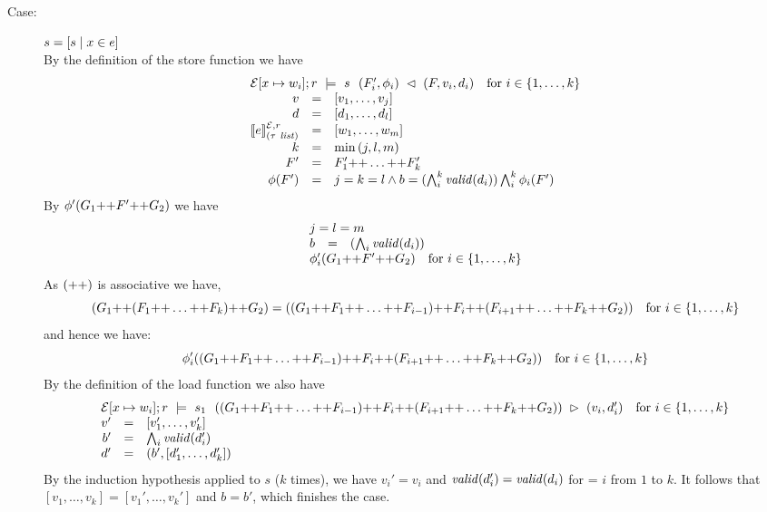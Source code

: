 {\begin{description}
\item[Case:] $s = [ s \mid x \in e ]$\\[1ex]
By the definition of the store function we have
\[
\begin{array}{rcll}
\multicolumn{3}{l}{\store{\Env[x \mapsto w_i]}{F}{r}{v_i,d_i}{s}{F_i',\phi_i} \quad \text{for}~i \in \{1,\dots,k\}}\\
v &=& [v_1,\dots,v_j]\\
d &=& [d_1,\dots,d_l]\\
\eval{e}{\Env,r}{(\tau\ \mathit{list})} &=& [w_1,\dots,w_m ]\\
k &=& \min{(j,l,m)}\\
F' &=& F_1' \FAppend \dots \FAppend F_k'\\
\phi(F') &=& j = k = l \wedge b = (\bigwedge_i^k \valid{d_i}) \bigwedge_i^k \phi_i(F')\\
\end{array}
\]
By $\phi'(G_1 \text{++} F' \text{++} G_2)$ we have
\[
\begin{array}{rcll}
\multicolumn{3}{l}{j = l = m}\\
b &=& (\bigwedge_i \valid{d_i})\\
\multicolumn{3}{l}{\phi_i'(G_1 \FAppend F' \FAppend G_2) \quad \text{for}~i \in \{1,\dots,k\}}\\
\end{array}
\]
%
As $(\text{++})$ is associative we have,
\[
(G_1\text{++} (F_1\text{++} \dots \text{++} F_k)\text{++} G_2) =
((G_1\text{++} F_1\text{++} \dots \text{++} F_{i-1}) \text{++} F_i \text{++} (F_{i+1} \text{++} \dots \text{++} F_k \text{++} G_2)) 
\quad \text{for}~i \in \{1,\dots,k\}
\]
and hence we have:
\[
\phi_i'((G_1\text{++} F_1\text{++} \dots \text{++} F_{i-1}) \text{++} F_i \text{++} (F_{i+1} \text{++} \dots \text{++} F_k \text{++} G_2)) 
\quad \text{for}~i \in \{1,\dots,k\}
\]
%
By the definition of the load function we also have 
\[ 
\begin{array}{rcll}
\multicolumn{3}{l}{\load{\Env[ x \mapsto w_i]}{((G_1\FAppend F_1\FAppend \dots \FAppend F_{i-1}) \FAppend F_i \FAppend (F_{i+1} \FAppend \dots \FAppend F_k \FAppend G_2))}{r}{s_1}{v_i,d_i'} \quad \text{for}~i \in \{1,\dots,k\}}\\
v' &=& [v_1',\dots,v_k']\\
b' &= &\bigwedge_i \valid{d_i'}\\
d' &=& (b',[d_1',\dots,d_k'])\\
\end{array}
\]
%
By the induction hypothesis applied to $s$ ($k$ times), we have $v_i'
= v_i$ and $\mathit{valid}(d_i') = \mathit{valid}(d_i)$ for = $i$ from $1$ to
$k$. It follows that $[v_1,\dots,v_k] = [v_1',\dots,v_k']$ and $b =
b'$, which finishes the case.


\end{description}}
